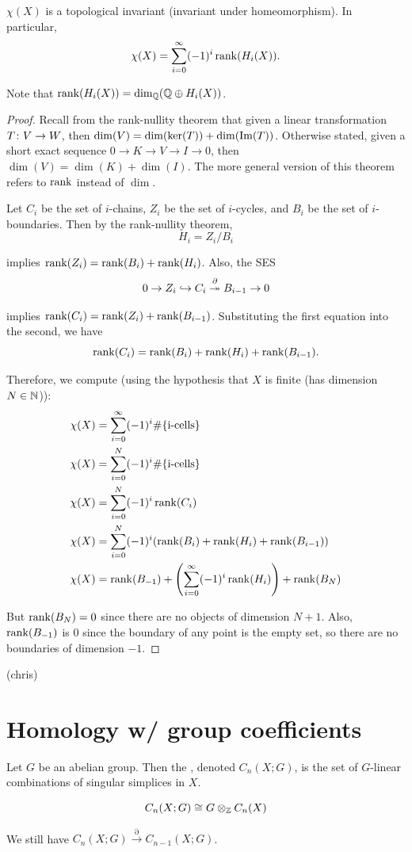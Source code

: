 \documentclass[11pt,leqno,oneside]{amsart}
\newenvironment{dateenv}{
  \vspace{1em}
}{
  \vspace{1em}
}
\newcommand{\mydate}[4]{
  \newdate{#1}{#2}{#3}{#4}
  \begin{dateenv}
    \hfill\displaydate{#1}
  \end{dateenv}
}
\numberwithin{thm}{section}
\renewcommand{\d}{\partial}
\begin{document}
\begin{thm}
  $\chi(X)$ is a topological invariant (invariant under homeomorphism).  In particular,
  $$ \chi(X) = \sum_{i=0}^\infty (-1)^i \operatorname{rank}(H_i(X)). $$

  Note that $\operatorname{rank}(H_i(X)) = \dim_{{\mathbb Q}}({\mathbb Q} \oplus H_i(X))$.
\end{thm}
\begin{proof}
  Recall from the rank-nullity theorem that given a linear transformation $T \colon V \to W$, then $\dim(V) = \dim(\ker(T)) + \dim(\operatorname{Im}(T))$.  Otherwise stated, given a short exact sequence $0 \to K \to V \to I \to 0$, then $\dim(V) = \dim(K) + \dim(I)$.  The more general version of this theorem refers to $\operatorname{rank}$ instead of $\dim$.

  Let $C_i$ be the set of $i$-chains, $Z_i$ be the set of $i$-cycles, and $B_i$ be the set of $i$-boundaries.  Then by the rank-nullity theorem,
  $$ H_i = Z_i/B_i $$

  implies $\operatorname{rank}(Z_i) = \operatorname{rank}(B_i) + \operatorname{rank}(H_i)$.  Also, the SES
  $$ 0 \to Z_i \into C_i \overset{\d}{\onto} B_{i-1} \to 0 $$

  implies $\operatorname{rank}(C_i) = \operatorname{rank}(Z_i) + \operatorname{rank}(B_{i-1})$.  Substituting the first equation into the second, we have
  $$ \operatorname{rank}(C_i) = \operatorname{rank}(B_i) + \operatorname{rank}(H_i) + \operatorname{rank}(B_{i-1}).$$

  Therefore, we compute (using the hypothesis that $X$ is finite (has dimension $N \in {\mathbb N}$)):
  \begin{align}
    \chi(X) &= \sum_{i=0}^\infty (-1)^i \#\{\text{i-cells}\} \\
    \chi(X) &= \sum_{i=0}^N (-1)^i \#\{\text{i-cells}\} \\
    \chi(X) &= \sum_{i=0}^N (-1)^i \operatorname{rank}(C_i) \\
    \chi(X) &= \sum_{i=0}^N (-1)^i (\operatorname{rank}(B_i) + \operatorname{rank}(H_i) + \operatorname{rank}(B_{i-1})) \\
    \chi(X) &= \operatorname{rank}(B_{-1}) + \left(\sum_{i=0}^\infty (-1)^i \operatorname{rank}(H_i)\right) + \operatorname{rank}(B_N)
  \end{align}

  But $\operatorname{rank}(B_N) = 0$ since there are no objects of dimension $N+1$.  Also, $\operatorname{rank}(B_{-1})$ is 0 since the boundary of any point is the empty set, so there are no boundaries of dimension $-1$.
\end{proof}

\mydate{dj}{14}{4}{2017}
(chris)

\section*{Homology w/ group coefficients}
\begin{defn}
  Let $G$ be an abelian group.  Then the , denoted $C_n(X; G)$, is the set of $G$-linear combinations of singular simplices in $X$.
\end{defn}
\begin{prop}
  $$ C_n(X; G) \mathrel{\cong} G \otimes_{\mathbb Z} C_n(X) $$
\end{prop}
  We still have $C_n(X; G) \overset{\d}{\to} C_{n-1}(X; G)$.
\end{document}
